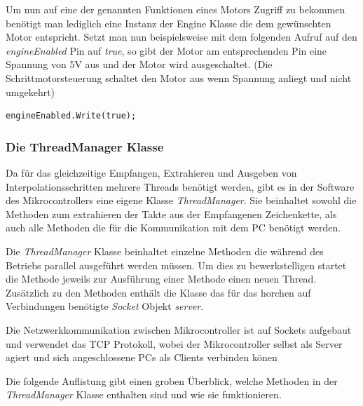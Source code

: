 Um nun auf eine der genannten Funktionen eines Motors Zugriff zu bekommen benötigt man lediglich eine Instanz der Engine Klasse die dem gewünschten Motor entspricht. Setzt man nun beispielsweise mit dem folgenden Aufruf auf den \textit{engineEnabled} Pin auf \textit{true}, so gibt der Motor am entsprechenden Pin eine Spannung von 5V aus und der Motor wird ausgeschaltet. (Die Schrittmotorsteuerung schaltet den Motor aus wenn Spannung anliegt und nicht umgekehrt)
\begin{lstlisting}[language = CSharp, captionpos=b, caption={Das Setzen eines OutputPins}]
engineEnabled.Write(true);
\end{lstlisting}
 
\subsubsection{Die ThreadManager Klasse}
Da für das gleichzeitige Empfangen, Extrahieren und Ausgeben von Interpolationsschritten mehrere Threads benötigt werden, gibt es in der Software des Mikrocontrollers eine eigene Klasse \textit{ThreadManager}. Sie beinhaltet sowohl die Methoden zum extrahieren der Takte aus der Empfangenen Zeichenkette, als auch alle Methoden die für die Kommunikation mit dem PC benötigt werden.

Die \textit{ThreadManager} Klasse beinhaltet einzelne Methoden die während des Betriebs parallel ausgeführt werden müssen. Um dies zu bewerkstelligen startet die Methode jeweils zur Ausführung einer Methode einen neuen Thread. Zusätzlich zu den Methoden enthält die Klasse das für das horchen auf Verbindungen benötigte \textit{Socket} Objekt \textit{server}.

Die Netzwerkkommunikation zwischen Mikrocontroller ist auf Sockets aufgebaut und verwendet das TCP Protokoll, wobei der Mikrocontroller selbst als Server agiert und sich angeschlossene PCs als Clients verbinden könen

Die folgende Auflistung gibt einen groben Überblick, welche Methoden in der \textit{ThreadManager} Klasse enthalten sind und wie sie funktionieren.

